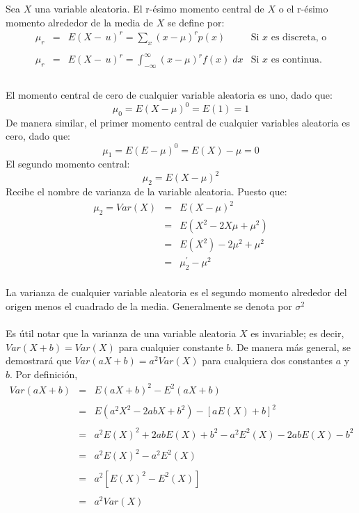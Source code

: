  \begin{tcolorbox}[colframe=white]
     \begin{def.}
	 Sea $X$ una variable aleatoria. El r-ésimo momento central de $X$ o el r-ésimo momento alrededor de la media de $X$ se define por:
	 $$\begin{array}{rcll}
	     \mu_r & = & E(X-\,u)^r = \sum_{x}(x-\mu)^r p(x) &  \mbox{Si $x$ es discreta, o}\\\\
	     \mu_r & = & E(X-\,u)^r = \displaystyle\int_{-\infty}^\infty (x-\mu)^r f(x)\; dx & \mbox{Si $x$ es continua.}\\\\
	 \end{array}$$
     \end{def.}
 \end{tcolorbox}

 El momento central de cero de cualquier variable aleatoria es uno, dado que:
 $$\mu_0 = E(X-\mu)^0 = E(1) = 1$$
 De manera similar, el primer momento central de cualquier variables aleatoria es cero, dado que:
 $$\mu_1 = E(E-\mu)^0 = E(X) - \mu = 0$$
 El segundo momento central:
 $$\mu_2 = E(X-\mu)^2$$
 Recibe el nombre de varianza de la variable aleatoria. Puesto que:
 $$\begin{array}{rcl}
     \mu_2 = Var(X) &=& E(X-\mu)^2\\
		    &=&E(X^2 - 2X\mu + \mu^2)\\
		    &=&E(X^2) - 2\mu^2 + \mu^2\\
		    &=&\mu_2^{'} - \mu^2\\
 \end{array}$$

 La varianza de cualquier variable aleatoria es el segundo momento alrededor del origen menos el cuadrado de la media. Generalmente se denota por $\sigma^2$\\\\
 Es útil notar que la varianza de una variable aleatoria $X$ es invariable; es decir, $Var(X+b) = Var(X)$ para cualquier constante $b$. De manera más general, se demostrará que $Var(aX+b) = a^2Var(X)$ para cualquiera dos constantes $a$ y $b$. Por definición,\\

 $$\begin{array}{rcl}
     Var(aX+b)&=&E(aX+b)^2 - E^2(aX+b)\\\\
	      &=&E(a^2X^2-2abX + b^2)-\left[a E(X)+b\right]^2\\\\
	      &=&a^2E(X)^2 + 2abE(X) + b^2 - a^2E^2(X) - 2abE(X) - b^2\\\\
	      &=&a^2 E(X)^2 - a^2E^2(X)\\\\
	      &=&a^2\left[E(X)^2 - E^2(X)\right]\\\\
	      &=&a^2Var(X)\\\\
 \end{array}$$

